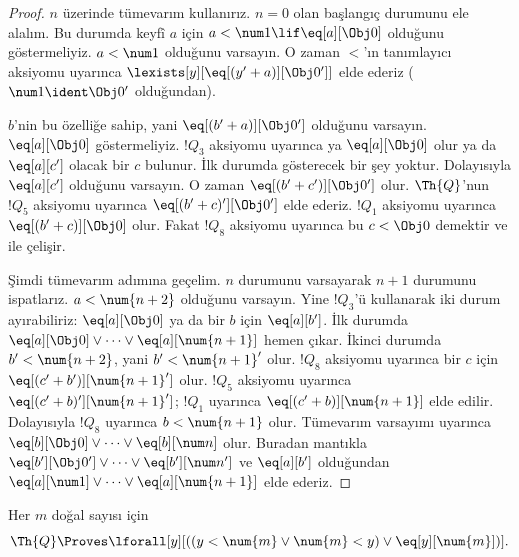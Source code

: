 \begin{proof}
$n$ üzerinde tümevarım kullanırız. $n=0$ olan başlangıç durumunu ele alalım.
Bu durumda keyfî $a$ için $a<\num 1\lif\eq[a][\Obj 0]$ olduğunu
göstermeliyiz. $a<\num 1$ olduğunu varsayın. O zaman $<$'ın tanımlayıcı
aksiyomu uyarınca $\lexists[y][\eq[(y'+a)][\Obj 0']]$ elde ederiz
($\num 1\ident\Obj 0'$ olduğundan).

$b$'nin bu özelliğe sahip, yani $\eq[(b'+a)][\Obj 0']$ olduğunu varsayın.
$\eq[a][\Obj 0]$ göstermeliyiz. $!Q_3$ aksiyomu uyarınca ya
$\eq[a][\Obj 0]$ olur ya da $\eq[a][c']$ olacak bir $c$ bulunur. İlk durumda
gösterecek bir şey yoktur. Dolayısıyla $\eq[a][c']$ olduğunu varsayın.
O zaman $\eq[(b'+c')][\Obj 0']$ olur. $\Th{Q}$'nun $!Q_5$ aksiyomu
uyarınca $\eq[(b'+c)'][\Obj 0']$ elde ederiz. $!Q_1$ aksiyomu uyarınca
$\eq[(b'+c)][\Obj 0]$ olur. Fakat $!Q_8$ aksiyomu uyarınca bu
$c<\Obj 0$ demektir ve  ile çelişir.

Şimdi tümevarım adımına geçelim. $n$ durumunu varsayarak $n+1$ durumunu
ispatlarız. $a<\num{n+2}$ olduğunu varsayın. Yine $!Q_3$'ü kullanarak iki
durum ayırabiliriz: $\eq[a][\Obj 0]$ ya da bir $b$ için $\eq[a][b']$.
İlk durumda $\eq[a][\Obj 0]\lor\dots\lor\eq[a][\num{n+1}]$ hemen çıkar.
İkinci durumda $b'<\num{n+2}$, yani $b'<\num{n+1}'$ olur. $!Q_8$ aksiyomu
uyarınca bir $c$ için $\eq[(c'+b')][\num{n+1}']$ olur. $!Q_5$ aksiyomu
uyarınca $\eq[(c'+b)'][\num{n+1}']$; $!Q_1$ uyarınca
$\eq[(c'+b)][\num{n+1}]$ elde edilir. Dolayısıyla $!Q_8$ uyarınca
$b<\num{n+1}$ olur. Tümevarım varsayımı uyarınca
$\eq[b][\Obj 0]\lor\dots\lor\eq[b][\num n]$ olur. Buradan mantıkla
$\eq[b'][\Obj 0']\lor\dots\lor\eq[b'][\num n']$ ve $\eq[a][b']$
olduğundan $\eq[a][\num 1]\lor\dots\lor\eq[a][\num{n+1}]$ elde ederiz.
\end{proof}

\begin{lem}
   Her $m$ doğal sayısı için
  \[
  \Th{Q} \Proves
  \lforall[y][((y < \num{m} \lor \num{m} < y) \lor \eq[y][\num{m}])].
  \]
\end{lem}

